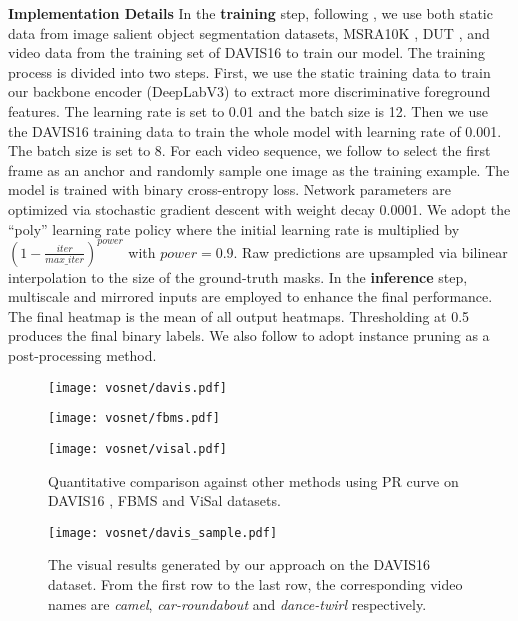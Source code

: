 \documentclass[runningheads]{llncs}
\begin{document}
\noindent \textbf{Implementation Details} In the \textbf{training} step, following \cite{vos_cosnet,vos_agnn,vos_pdb},  we use both static data from image salient object segmentation datasets, MSRA10K \cite{msra10k}, DUT \cite{duts}, and video data from the training set of DAVIS16 to train our model. The training process is divided into two steps. First, we use the static training data to train our backbone encoder (DeepLabV3) to extract more discriminative foreground features. The learning rate is set to 0.01 and the batch size is 12.  Then we use the DAVIS16 training data to train the whole model with learning rate of 0.001. The batch size is set to 8. For each video sequence, we follow \cite{vos_andiff} to select the first frame as an anchor and randomly sample one image as the training example. The model is trained with binary cross-entropy loss. Network parameters are optimized via stochastic gradient descent with weight decay 0.0001. We adopt the ``poly'' learning rate policy where the initial learning rate is multiplied by $(1-\frac{iter}{max\_iter})^{power}$ with $power=0.9$. Raw predictions are upsampled via bilinear interpolation to the size of the ground-truth masks. In the \textbf{inference} step, multiscale and mirrored inputs are employed to enhance the final performance.	The final heatmap is the mean of all output heatmaps. Thresholding at 0.5 produces the final binary labels. We also follow \cite{vos_andiff} to adopt instance pruning as a post-processing method.\\
\begin{figure*}[t!]
	\begin{minipage}[t]{0.32\linewidth} 
		\centering
		\texttt{[image: vosnet/davis.pdf]}
\end{minipage}
	\begin{minipage}[t]{0.32\linewidth} 
		\centering
		\texttt{[image: vosnet/fbms.pdf]}
\end{minipage} 
	\begin{minipage}[t]{0.32\linewidth} 
		\centering
		\texttt{[image: vosnet/visal.pdf]}
\end{minipage} 
	\caption{Quantitative comparison against other methods using PR curve on DAVIS16 \cite{davis_16}, FBMS \cite{fbms} and ViSal \cite{video_gafl} datasets. }
	\label{vos_pr}
\end{figure*}
\begin{figure*}[t!]
	\centering
	\texttt{[image: vosnet/davis\_sample.pdf]}
	\caption{The visual results generated by our approach on the DAVIS16 dataset. From the first row to the last row, the corresponding
		video names are \emph{camel}, \emph{car-roundabout} and \emph{dance-twirl} respectively.}
	\label{davis_sample}
\end{figure*}
\end{document}
